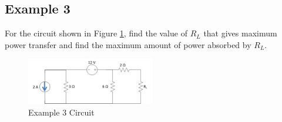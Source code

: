 \documentclass{handout}
\begin{document}

\newpage
\pagebreak
\clearpage

\subsection{Example 3}
For the circuit shown in Figure \ref{fig: Example3}, find the value of $R_L$ that gives maximum power transfer and find the maximum amount of power absorbed by $R_L$.
\begin{figure} [h t b]
\centering
\includegraphics[width=0.5\textwidth]{Example3.jpg}
\caption{Example 3 Circuit}
\label{fig: Example3}
\end{figure}


\newpage
\pagebreak
\clearpage
\end{document}
